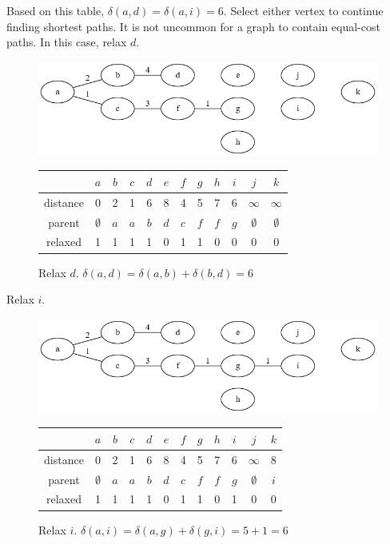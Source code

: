 \documentclass{book}
\begin{document}
Based on this table, $\delta(a,d)=\delta(a,i)=6$. Select either vertex to continue finding shortest paths. It is not uncommon for a graph to contain equal-cost paths. In this case, relax $d$.

\begin{figure}[H]
\centering
\includegraphics[width=.75\textwidth]{ch-dijkstra/spf6}
  \begin{tabular}{ | c | c | c | c | c | c | c | c | c | c | c | c | }
  \hline
   & $a$ & $b$ & $c$ & $d$ & $e$ & $f$ & $g$ & $h$ & $i$ & $j$ & $k$ \\
   \hline
   distance & 0 & 2 & 1 & 6 & 8 & 4 & 5 & 7 & 6 & $\infty$ & $\infty$ \\
   \hline
   parent & $\emptyset$ & $a$ & $a$ & $b$ & $d$ & $c$ & $f$ & $f$ & $g$ & $\emptyset$ & $\emptyset$ \\
   \hline
   relaxed & 1 & 1 & 1 & 1 & 0 & 1 & 1 & 0 & 0 & 0 & 0 \\
   \hline
  \end{tabular}
\caption{Relax $d$. $\delta(a,d) = \delta(a,b) + \delta(b,d) = 6$}
\label{spf6}
\end{figure}

Relax $i$.

\begin{figure}[H]
\centering
\includegraphics[width=.75\textwidth]{ch-dijkstra/spf7}
  \begin{tabular}{ | c | c | c | c | c | c | c | c | c | c | c | c | }
  \hline
   & $a$ & $b$ & $c$ & $d$ & $e$ & $f$ & $g$ & $h$ & $i$ & $j$ & $k$ \\
   \hline
   distance & 0 & 2 & 1 & 6 & 8 & 4 & 5 & 7 & 6 & $\infty$ & 8 \\
   \hline
   parent & $\emptyset$ & $a$ & $a$ & $b$ & $d$ & $c$ & $f$ & $f$ & $g$ & $\emptyset$ & $i$ \\
   \hline
   relaxed & 1 & 1 & 1 & 1 & 0 & 1 & 1 & 0 & 1 & 0 & 0 \\
   \hline
  \end{tabular}
\caption{Relax $i$. $\delta(a,i) = \delta(a,g) + \delta(g,i) = 5 + 1 = 6$}
\label{spf7}
\end{figure}
\end{document}
